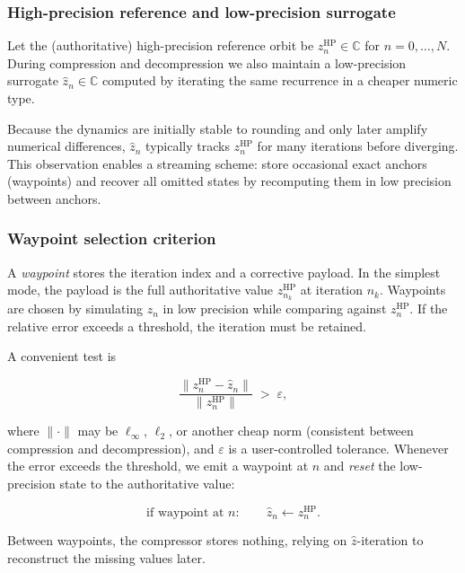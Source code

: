 \subsubsection{High-precision reference and low-precision surrogate}
Let the (authoritative) high-precision reference orbit be
\(
z_n^{\mathrm{HP}} \in \mathbb{C}
\)
for \(n=0,\dots,N\).
During compression and decompression we also maintain a low-precision surrogate
\(
\hat z_n \in \mathbb{C}
\)
computed by iterating the same recurrence in a cheaper numeric type.

Because the dynamics are initially stable to rounding and only later amplify
numerical differences, \(\hat z_n\) typically tracks \(z_n^{\mathrm{HP}}\) for
many iterations before diverging.  This observation enables a streaming scheme:
store occasional exact anchors (waypoints) and recover all omitted states by
recomputing them in low precision between anchors.

\subsubsection{Waypoint selection criterion}
A \emph{waypoint} stores the iteration index and a corrective payload.
In the simplest mode, the payload is the full authoritative value
\(z_{n_k}^{\mathrm{HP}}\) at iteration \(n_k\).
Waypoints are chosen by simulating \(\hat z_n\) in low precision while comparing
against \(z_n^{\mathrm{HP}}\).  If the relative error exceeds a threshold, the
iteration must be retained.

A convenient test is

\begin{equation}
  \frac{\lVert z_n^{\mathrm{HP}} - \hat z_n \rVert}{\lVert z_n^{\mathrm{HP}} \rVert}
  \;>\; \varepsilon,
  \label{eq:relerr-test}
\end{equation}

where \(\lVert \cdot \rVert\) may be \(\ell_\infty\), \(\ell_2\), or another cheap norm
(consistent between compression and decompression), and \(\varepsilon\) is a
user-controlled tolerance.  Whenever the error exceeds the threshold, we emit a waypoint at \(n\)
and \emph{reset} the low-precision state to the authoritative value:

\begin{equation}
  \text{if waypoint at } n:\qquad \hat z_n \leftarrow z_n^{\mathrm{HP}}.
\end{equation}

Between waypoints, the compressor stores nothing, relying on \(\hat z\)-iteration
to reconstruct the missing values later.

